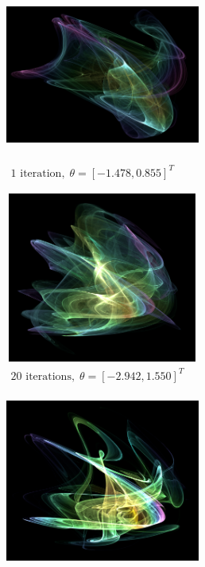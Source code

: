 \begin{figure}[t]
	\centering
	\begin{subfigure}[t]{0.48\textwidth}
		\centering
		\includegraphics[height=5.6cm,width=6.4cm]{chaos/compressed/first_iter_alt.png}
		\caption{{$\begin{array}{c}
				\text{1 iteration}, \; 
				\theta = [-1.478,0.855]^T 
				\end{array}$}}
	\end{subfigure}
	\begin{subfigure}[t]{0.48\textwidth}
		\centering
		\tiny
		\includegraphics[height=5.6cm,width=6.4cm]{chaos/compressed/20_iter_alt.png}
		\caption{{$\begin{array}{c}
				\text{20 iterations}, \; 
				\theta = [-2.942,1.550]^T 
				\end{array}$}}
	\end{subfigure}
	\begin{subfigure}[t]{0.48\textwidth}
		\centering
		\tiny
		\includegraphics[height=5.6cm,width=6.4cm]{chaos/compressed/100_iter_altj.png}

\end{subfigure}
\end{figure}

